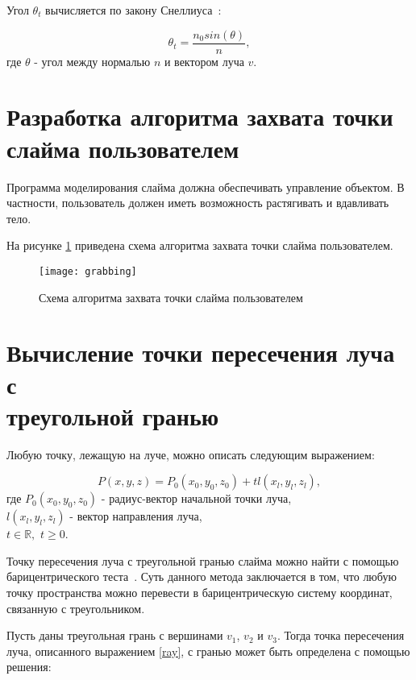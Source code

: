 Угол $\theta_t$ вычисляется по закону Снеллиуса~\cite{raytracingen}:

\begin{equation}\label{snell}
	\theta_t = \frac{n_0sin(\theta)}{n},
\end{equation}
где $\theta$ - угол между нормалью $n$ и вектором луча $v$.

\section{Разработка алгоритма захвата точки\\слайма пользователем}

Программа моделирования слайма должна обеспечивать управление объектом. В частности, пользователь должен иметь возможность растягивать и вдавливать тело.

На рисунке \ref{grabbing} приведена схема алгоритма захвата точки слайма пользователем.

\begin{figure}[H]
	\centering
	\texttt{[image: grabbing]}
	\caption{Схема алгоритма захвата точки слайма пользователем}
	\label{grabbing}
\end{figure}

\section{Вычисление точки пересечения луча с\\треугольной гранью}

Любую точку, лежащую на луче, можно описать следующим выражением:

\begin{equation}\label{ray}
	P(x, y, z) = P_0(x_0, y_0, z_0) + tl(x_l, y_l, z_l),
\end{equation}
где $P_0(x_0, y_0, z_0)$ - радиус-вектор начальной точки луча,\\
\text{~~~~~~}$l(x_l, y_l, z_l)$ - вектор направления луча,\\
\text{~~~~~~}$t \in \mathbb{R},$ $t \ge 0$.

Точку пересечения луча с треугольной гранью слайма можно найти с помощью барицентрического теста~\cite{intersection}. Суть данного метода заключается в том, что любую точку пространства можно перевести в барицентрическую систему координат, связанную с треугольником.

Пусть даны треугольная грань с вершинами $v_1$, $v_2$ и $v_3$. Тогда точка пересечения луча, описанного выражением \eqref{ray}, с гранью может быть определена с помощью решения:

